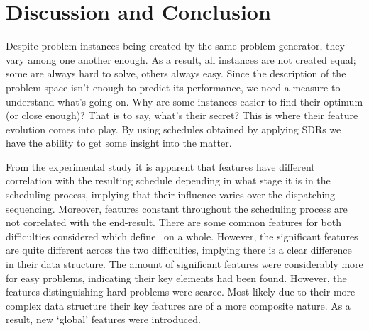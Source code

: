 \subsection{\Jrndn}\label{sec:diff:jrndn}
\subsection{\Frnd}\label{sec:diff:frnd}
\subsection{\Frndn}\label{sec:diff:frndn}
\subsection{\Fjc}\label{sec:diff:fjc}
\subsection{\Fmc}\label{sec:diff:fmc}
\subsection{\Fmxc}\label{sec:diff:fmxc}

\section{Discussion and Conclusion}
Despite problem instances being created by the same problem generator, they vary among one another enough. As a result, all instances are not created equal; some are always hard to solve, others always easy. 
Since the description of the problem space isn't enough to predict its performance, we need a measure to understand what's going on. Why are some instances easier to find their optimum (or close enough)? That is to say, what's their secret? This is where their feature evolution comes into play.
By using schedules obtained by applying SDRs we have the ability to get some insight into the matter. 

From the experimental study it is apparent that features have different %
correlation with the resulting schedule depending in what stage it is in the scheduling process, implying that their influence varies over the dispatching sequencing. Moreover, features constant throughout the scheduling process are not correlated with the end-result.
There are some common features for both difficulties considered which define 
\jsp\ on a whole. However, the significant features are quite different across 
the two difficulties, implying there is a clear difference in their data 
structure. The amount of significant features were considerably more for easy 
problems, indicating their key elements had been found. However, the features 
distinguishing hard problems were scarce. Most likely due to their more complex 
data structure their key features are of a more composite nature. As a result, 
new `global' features were introduced. 

